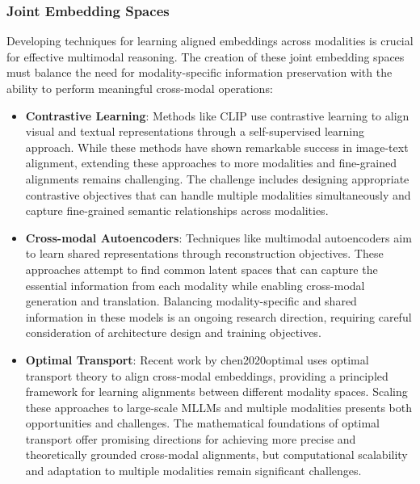 \subsubsection{Joint Embedding Spaces}
Developing techniques for learning aligned embeddings across modalities is crucial for effective multimodal reasoning. The creation of these joint embedding spaces must balance the need for modality-specific information preservation with the ability to perform meaningful cross-modal operations:

\begin{itemize}
    \item \textbf{Contrastive Learning}: Methods like CLIP \citep{radford2021learning} use contrastive learning to align visual and textual representations through a self-supervised learning approach. While these methods have shown remarkable success in image-text alignment, extending these approaches to more modalities and fine-grained alignments remains challenging. The challenge includes designing appropriate contrastive objectives that can handle multiple modalities simultaneously and capture fine-grained semantic relationships across modalities.
    
    \item \textbf{Cross-modal Autoencoders}: Techniques like multimodal autoencoders \citep{ngiam2011multimodal} aim to learn shared representations through reconstruction objectives. These approaches attempt to find common latent spaces that can capture the essential information from each modality while enabling cross-modal generation and translation. Balancing modality-specific and shared information in these models is an ongoing research direction, requiring careful consideration of architecture design and training objectives.
    
    \item \textbf{Optimal Transport}: Recent work by chen2020optimal uses optimal transport theory to align cross-modal embeddings, providing a principled framework for learning alignments between different modality spaces. Scaling these approaches to large-scale MLLMs and multiple modalities presents both opportunities and challenges. The mathematical foundations of optimal transport offer promising directions for achieving more precise and theoretically grounded cross-modal alignments, but computational scalability and adaptation to multiple modalities remain significant challenges.

\end{itemize}

